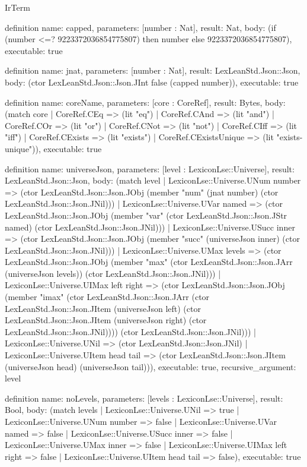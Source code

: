 \begin{lexlean}{IrTerm}
\begin{semanticmodule}
definition{
  name: capped,
  parameters: [number : Nat],
  result: Nat,
  body: (if (number <=? 9223372036854775807) then number else 9223372036854775807),
  executable: true
}

definition{
  name: jnat,
  parameters: [number : Nat],
  result: LexLeanStd.Json::Json,
  body: (ctor LexLeanStd.Json::Json.JInt false (capped number)),
  executable: true
}

definition{
  name: coreName,
  parameters: [core : CoreRef],
  result: Bytes,
  body: (match core
    | CoreRef.CEq => (lit "eq")
    | CoreRef.CAnd => (lit "and")
    | CoreRef.COr => (lit "or")
    | CoreRef.CNot => (lit "not")
    | CoreRef.CIff => (lit "iff")
    | CoreRef.CExists => (lit "exists")
    | CoreRef.CExistsUnique => (lit "exists-unique")),
  executable: true
}

definition{
  name: universeJson,
  parameters: [level : LexiconLse::Universe],
  result: LexLeanStd.Json::Json,
  body: (match level
    | LexiconLse::Universe.UNum number => (ctor LexLeanStd.Json::Json.JObj (member "num" (jnat number) (ctor LexLeanStd.Json::Json.JNil)))
    | LexiconLse::Universe.UVar named => (ctor LexLeanStd.Json::Json.JObj (member "var" (ctor LexLeanStd.Json::Json.JStr named) (ctor LexLeanStd.Json::Json.JNil)))
    | LexiconLse::Universe.USucc inner => (ctor LexLeanStd.Json::Json.JObj (member "succ" (universeJson inner) (ctor LexLeanStd.Json::Json.JNil)))
    | LexiconLse::Universe.UMax levels => (ctor LexLeanStd.Json::Json.JObj (member "max" (ctor LexLeanStd.Json::Json.JArr (universeJson levels)) (ctor LexLeanStd.Json::Json.JNil)))
    | LexiconLse::Universe.UIMax left right => (ctor LexLeanStd.Json::Json.JObj (member "imax" (ctor LexLeanStd.Json::Json.JArr (ctor LexLeanStd.Json::Json.JItem (universeJson left) (ctor LexLeanStd.Json::Json.JItem (universeJson right) (ctor LexLeanStd.Json::Json.JNil)))) (ctor LexLeanStd.Json::Json.JNil)))
    | LexiconLse::Universe.UNil => (ctor LexLeanStd.Json::Json.JNil)
    | LexiconLse::Universe.UItem head tail => (ctor LexLeanStd.Json::Json.JItem (universeJson head) (universeJson tail))),
  executable: true,
  recursive_argument: level
}

definition{
  name: noLevels,
  parameters: [levels : LexiconLse::Universe],
  result: Bool,
  body: (match levels
    | LexiconLse::Universe.UNil => true
    | LexiconLse::Universe.UNum number => false
    | LexiconLse::Universe.UVar named => false
    | LexiconLse::Universe.USucc inner => false
    | LexiconLse::Universe.UMax inner => false
    | LexiconLse::Universe.UIMax left right => false
    | LexiconLse::Universe.UItem head tail => false),
  executable: true
}


\end{semanticmodule}
\end{lexlean}
